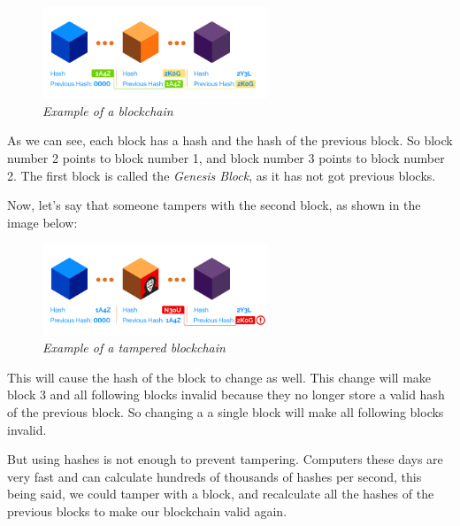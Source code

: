 \documentclass{article}
\begin{document}
\begin{figure}[H]
    \begin{center}
        \includegraphics[width=0.6\textwidth]{images/changes_in_block.png}
        \caption{\textit{Example of a blockchain}}
    \end{center}
\end{figure}

As we can see, each block has a hash and the hash of the previous block. So block number 2 points to block number 1, and block number 3 points to block number 2. The first block is called the \textit{Genesis Block}, as it has not got previous blocks.

Now, let's say that someone tampers with the second block, as shown in the image below:

\begin{figure}[H]
    \begin{center}
        \includegraphics[width=0.6\textwidth]{images/invalid_hash.png}
        \caption{\textit{Example of a tampered blockchain}}
    \end{center}
\end{figure}

This will cause the hash of the block to change as well. This change will make block 3 and all following blocks invalid because they no longer store a valid hash of the previous block. So changing a a single block will make all following blocks invalid.

But using hashes is not enough to prevent tampering. Computers these days are very fast and can calculate hundreds of thousands of hashes per second, this being said, we could tamper with a block, and recalculate all the hashes of the previous blocks to make our blockchain valid again.
\end{document}

